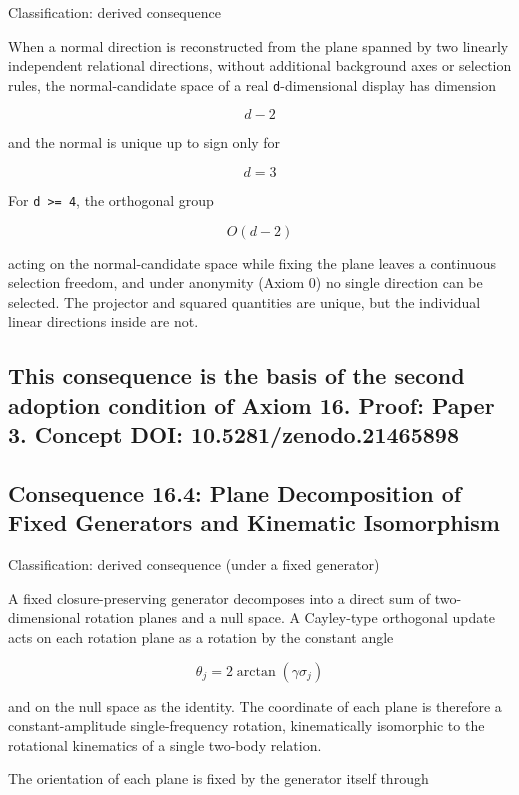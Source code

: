 \documentclass[
  a4paper,
]{article}
\begin{document}
Classification: derived consequence

When a normal direction is reconstructed from the plane spanned by two
linearly independent relational directions, without additional
background axes or selection rules, the normal-candidate space of a real
\texttt{d}-dimensional display has dimension

\[
d-2
\]

and the normal is unique up to sign only for

\[
d=3
\]

For \texttt{d\ \textgreater{}=\ 4}, the orthogonal group

\[
O(d-2)
\]

acting on the normal-candidate space while fixing the plane leaves a
continuous selection freedom, and under anonymity (Axiom 0) no single
direction can be selected. The projector and squared quantities are
unique, but the individual linear directions inside are not.

\subsection{This consequence is the basis of the second adoption
condition of Axiom 16. Proof: Paper 3. Concept DOI:
10.5281/zenodo.21465898}\label{this-consequence-is-the-basis-of-the-second-adoption-condition-of-axiom-16.-proof-paper-3.-concept-doi-10.5281zenodo.21465898}

\subsection{Consequence 16.4: Plane Decomposition of Fixed Generators
and Kinematic
Isomorphism}\label{consequence-16.4-plane-decomposition-of-fixed-generators-and-kinematic-isomorphism}

Classification: derived consequence (under a fixed generator)

A fixed closure-preserving generator decomposes into a direct sum of
two-dimensional rotation planes and a null space. A Cayley-type
orthogonal update acts on each rotation plane as a rotation by the
constant angle

\[
\theta_j=2\arctan(\gamma\sigma_j)
\]

and on the null space as the identity. The coordinate of each plane is
therefore a constant-amplitude single-frequency rotation, kinematically
isomorphic to the rotational kinematics of a single two-body relation.

The orientation of each plane is fixed by the generator itself through
\end{document}
